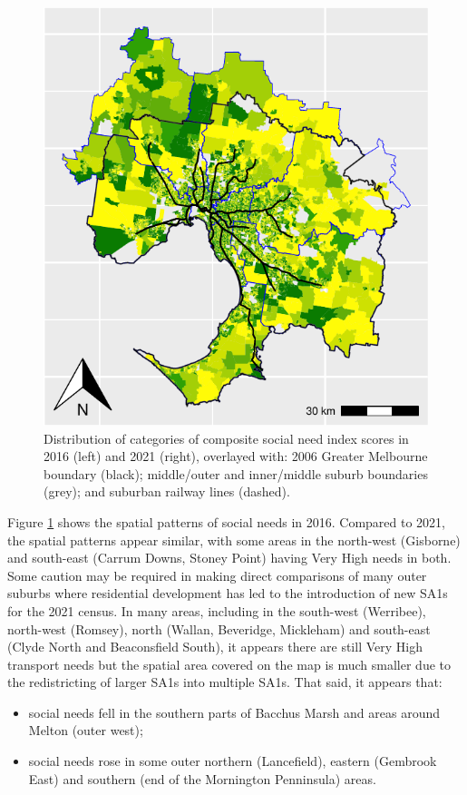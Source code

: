 \documentclass[preprint, 3p,
authoryear]{elsarticle} %
\providecommand{\tightlist}{%
  \setlength{\itemsep}{0pt}\setlength{\parskip}{0pt}}
\begin{document}
\begin{figure}
\includegraphics[width=0.9\linewidth]{Leveraging_GTFS_to_assess_transit_supply_Transport_Geography_files/figure-latex/Greater_Melbourne_2016_social_needs_appendix-1} \caption{Distribution of categories of composite social need index scores in 2016 (left) and 2021 (right), overlayed with: 2006 Greater Melbourne boundary (black); middle/outer and inner/middle suburb boundaries (grey); and suburban railway lines (dashed).}\label{fig:Greater_Melbourne_2016_social_needs_appendix}
\end{figure}

Figure \ref{fig:Greater_Melbourne_2016_social_needs_appendix} shows the
spatial patterns of social needs in 2016. Compared to 2021, the spatial
patterns appear similar, with some areas in the north-west (Gisborne)
and south-east (Carrum Downs, Stoney Point) having Very High needs in
both. Some caution may be required in making direct comparisons of many
outer suburbs where residential development has led to the introduction
of new SA1s for the 2021 census. In many areas, including in the
south-west (Werribee), north-west (Romsey), north (Wallan, Beveridge,
Mickleham) and south-east (Clyde North and Beaconsfield South), it
appears there are still Very High transport needs but the spatial area
covered on the map is much smaller due to the redistricting of larger
SA1s into multiple SA1s. That said, it appears that:

\begin{itemize}
\tightlist
\item
  social needs fell in the southern parts of Bacchus Marsh and areas
  around Melton (outer west);
\item
  social needs rose in some outer northern (Lancefield), eastern
  (Gembrook East) and southern (end of the Mornington Penninsula) areas.
\end{itemize}


\end{document}
